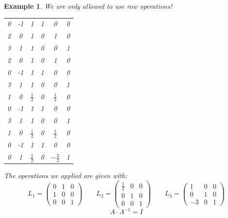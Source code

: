 \documentclass[a4paper,landscape,twocolumn]{article}
\newtheorem{ex}{Example}[section]
\begin{document}
\begin{ex}
  \label{beispiel-6.37}
  We are only allowed to use row operations!
  \begin{center}
    \begin{tabular}{ccc|ccc}
      0 & -1 & 1 & 1 & 0 & 0 \\
      2 &  0 & 1 & 0 & 1 & 0 \\
      3 &  1 & 1 & 0 & 0 & 1 \\
    \hline
      2 &  0 & 1 &  0 & 1 & 0 \\
      0 & -1 & 1 &  1 & 0 & 0 \\
      3 &  1 & 1 &  0 & 0 & 1 \\
    \hline
      1 &  0 & $\frac12$ & 0 & $\frac12$ & 0 \\
      0 & -1 & 1 & 1 & 0 & 0 \\
      3 & 1 & 1 & 0 & 0 & 1 \\
    \hline
      1 & 0 & $\frac12$ & 0 & $\frac12$ & 0 \\
      0 & -1 & 1 & 1 & 0 & 0 \\
      0 & 1 & $\frac12$ & 0 & $-\frac32$ & 1
    \end{tabular}
  \end{center}
  The operations we applied are given with:
  \[
    L_1 = \begin{pmatrix}
      0 & 1 & 0 \\
      1 & 0 & 0 \\
      0 & 0 & 1
    \end{pmatrix}
    \qquad
    L_2 = \begin{pmatrix}
      \frac12 & 0 & 0 \\
            0 & 1 & 0 \\
            0 & 0 & 1
    \end{pmatrix}
    \qquad
    L_3 = \begin{pmatrix}
       1 & 0 & 0 \\
       0 & 1 & 0 \\
      -3 & 0 & 1
    \end{pmatrix}
  \]
  \[ A \cdot A^{-1} = I \]


\end{ex}
\end{document}
